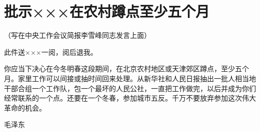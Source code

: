 \section[批示×××在农村蹲点至少五个月（一九六三年六月三日）]{批示×××在农村蹲点至少五个月}
{\noindent\kaishu\centering （写在中央工作会议简报李雪峰同志发言上面）\par}

此件送×××一阅，阅后退我。

你应当下决心在今冬明春这段期间，在北京农村地区或天津郊区蹲点，至少五个月。家里工作可以间接或抽时间回来处理。从新华社和人民日报抽出一批人相当地干部合组一个工作队，包一个最坏的人民公社，一直把工作做完，以后并成为你们经常联系的一个点。还要在一个冬春，参加城市五反。千万不要放弃参加这次伟大革命的机会。

{\raggedleft 毛泽东\par}

